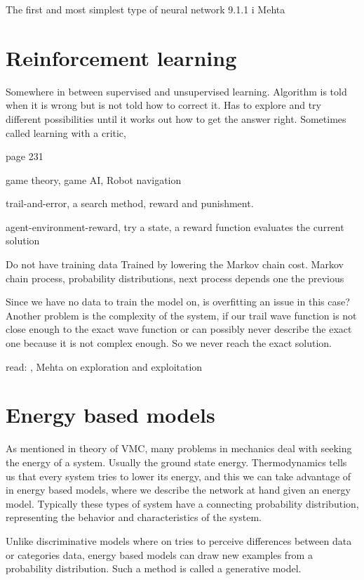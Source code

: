 The first and most simplest type of neural network 
9.1.1 i Mehta

\section{Reinforcement learning}

Somewhere in between supervised and unsupervised learning. Algorithm is told when it is wrong but is not told how to correct it. Has to explore and try different possibilities until it works out how to get the answer right. 
Sometimes called learning with a critic, 

page 231 \cite{marsland2014machine}

game theory, game AI, Robot navigation

trail-and-error, a search method, reward and punishment. 

agent-environment-reward, try a state, a reward function evaluates the current solution

Do not have training data
Trained by lowering the Markov chain cost.
Markov chain process, probability distributions, next process depends one the previous

Since we have no data to train the model on, is overfitting an issue in this case? 
Another problem is the complexity of the system, if our trail wave function is not close enough to the exact wave function or can possibly never describe the exact one because it is not complex enough. So we never reach the exact solution. 

read: \cite{mehta2019high}, Mehta on exploration and exploitation


\section{Energy based models}

As mentioned in theory of VMC, many problems in mechanics deal with seeking the energy of a system. Usually the ground state energy. Thermodynamics tells us that every system tries to lower its energy, and this we can take advantage of in energy based models, where we describe the network at hand given an energy model. Typically these types of system have a connecting probability distribution, representing the behavior and characteristics of the system. 

Unlike discriminative models where on tries to perceive differences between data or categories data, energy based models can draw new examples from a probability distribution. Such a method is called a generative model. 

